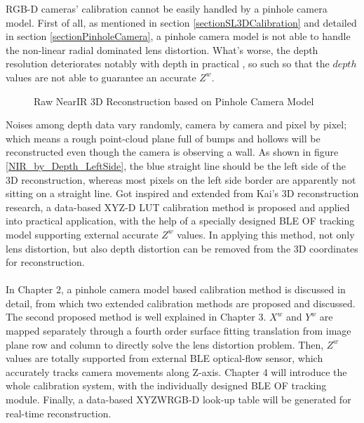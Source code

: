  RGB-D cameras' calibration cannot be easily handled by a pinhole camera model. First of all, as mentioned in section \ref{sectionSL3DCalibration} and detailed in section \ref{sectionPinholeCamera}, a pinhole camera model is not able to handle the non-linear radial dominated lens distortion. What's worse, the depth resolution deteriorates notably with depth in practical \cite{Krystof12}, so such so that the \(depth\) values are not able to guarantee an accurate  \(Z^{w}\).
%
 \begin{figure}[H]
{}
\caption{Raw NearIR 3D Reconstruction based on Pinhole Camera Model}
\label{NearIR}
\end{figure}%
%
Noises among depth data vary randomly, camera by camera and pixel by pixel; which means a rough point-cloud plane full of bumps and hollows will be reconstructed even though the camera is observing a wall. As shown in figure \ref{NIR_by_Depth_LeftSide}, the blue straight line should be the left side of the 3D reconstruction, whereas most pixels on the left side border are apparently not sitting on a straight line.%
%
Got inspired and extended from Kai's 3D reconstruction research, a data-based XYZ-D LUT calibration method is proposed and applied into practical application, with the help of a specially designed BLE OF tracking model supporting external accurate \(Z^{w}\) values. In applying this method, not only lens distortion, but also depth distortion can be removed from the 3D coordinates for reconstruction.%
\\\\%
In Chapter 2, a pinhole camera model based calibration method is discussed in detail, from which two extended calibration methods are proposed and discussed. The second proposed method is well explained in Chapter 3. \(X^{w}\) and \(Y^{w}\) are mapped separately through a fourth order surface fitting translation from image plane row and column to directly solve the lens distortion problem. Then, \(Z^{w}\) values are totally supported from external BLE optical-flow sensor, which accurately tracks camera movements along Z-axis. Chapter 4 will introduce the whole calibration system, with the individually designed BLE OF tracking module. Finally, a data-based XYZWRGB-D look-up table will be generated for real-time reconstruction.




































